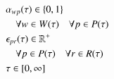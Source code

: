 \begin{alignat}{2}
	& \alpha_{wp}(\tau) \in \{0, 1\} \notag                                                                                                                                                                                                                  \\
	& \quad \forall w \in W(\tau) \quad \forall p \in P(\tau)     \label{eqn:x_integrality_constraint}                                                                                                                                                                 \\ 
	& \epsilon_{pr}(\tau) \in \mathbb{R}^{+} \notag                                                                                                                                                                                                                                                            \\ 
	& \quad \forall p \in P(\tau) \quad \forall r \in R(\tau)                           \label{eqn:p_non_negativity_constraint}                                                                                                                                            \\ 
	& \tau \in  [0, \infty] 
\end{alignat}

